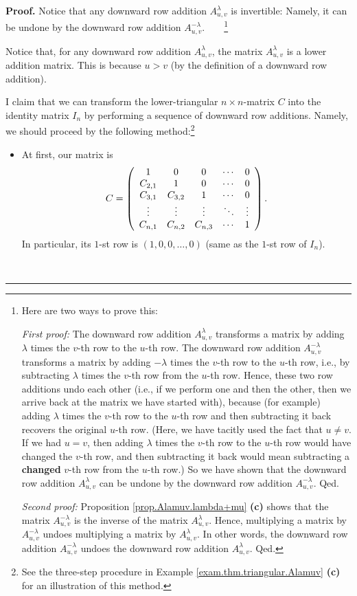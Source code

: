 \documentclass[numbers=enddot,12pt,final,onecolumn,notitlepage]{scrartcl}%
\theoremstyle{definition}
\newenvironment{proof}[1][Proof]{\noindent\textbf{#1.} }{\ \rule{0.5em}{0.5em}}
\begin{document}
\begin{proof}
Notice that any downward row addition $A^{\lambda}_{u,v}$ is invertible:
Namely, it can be undone by the downward row addition $A^{-\lambda}_{u,v}%
$.\ \ \ \ \footnote{Here are two ways to prove this:
\par
\textit{First proof:} The downward row addition $A^{\lambda}_{u,v}$ transforms
a matrix by adding $\lambda$ times the $v$-th row to the $u$-th row. The
downward row addition $A^{-\lambda}_{u,v}$ transforms a matrix by adding
$-\lambda$ times the $v$-th row to the $u$-th row, i.e., by subtracting
$\lambda$ times the $v$-th row from the $u$-th row. Hence, these two row
additions undo each other (i.e., if we perform one and then the other, then we
arrive back at the matrix we have started with), because (for example) adding
$\lambda$ times the $v$-th row to the $u$-th row and then subtracting it back
recovers the original $u$-th row. (Here, we have tacitly used the fact that $u
\neq v$. If we had $u = v$, then adding $\lambda$ times the $v$-th row to the
$u$-th row would have changed the $v$-th row, and then subtracting it back
would mean subtracting a \textbf{changed} $v$-th row from the $u$-th row.) So
we have shown that the downward row addition $A^{\lambda}_{u,v}$ can be undone
by the downward row addition $A^{-\lambda}_{u,v}$. Qed.
\par
\textit{Second proof:} Proposition \ref{prop.Alamuv.lambda+mu} \textbf{(c)}
shows that the matrix $A^{-\lambda}_{u,v}$ is the inverse of the matrix
$A^{\lambda}_{u,v}$. Hence, multiplying a matrix by $A^{-\lambda}_{u,v}$
undoes multiplying a matrix by $A^{\lambda}_{u,v}$. In other words, the
downward row addition $A^{-\lambda}_{u,v}$ undoes the downward row addition
$A^{\lambda}_{u,v}$. Qed.}

Notice that, for any downward row addition $A^{\lambda}_{u,v}$, the matrix
$A^{\lambda}_{u,v}$ is a lower addition matrix. This is because $u > v$ (by
the definition of a downward row addition).

I claim that we can transform the lower-triangular $n\times n$-matrix $C$ into
the identity matrix $I_{n}$ by performing a sequence of downward row
additions. Namely, we should proceed by the following method:\footnote{See the
three-step procedure in Example \ref{exam.thm.triangular.Alamuv} \textbf{(c)}
for an illustration of this method.}

\begin{itemize}
\item At first, our matrix is
\[
C = \left(
\begin{array}
[c]{ccccc}%
1 & 0 & 0 & \cdots & 0\\
C_{2,1} & 1 & 0 & \cdots & 0\\
C_{3,1} & C_{3,2} & 1 & \cdots & 0\\
\vdots & \vdots & \vdots & \ddots & \vdots\\
C_{n,1} & C_{n,2} & C_{n,3} & \cdots & 1
\end{array}
\right)  .
\]
In particular, its $1$-st row is $\left(  1,0,0,\ldots,0\right)  $ (same as
the $1$-st row of $I_{n}$).


\end{itemize}
\end{proof}
\end{document}
